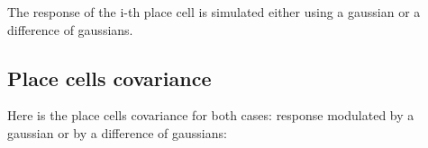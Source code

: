 \documentclass{article}
\begin{document}
\begin{figure}[H]
\centering
{}
\end{figure}


The response of the i-th place cell is simulated either using a gaussian or a difference of gaussians.

\subsection{Place cells covariance}

Here is the place cells covariance for both cases: response modulated by a gaussian or by a difference of gaussians:
\end{document}
